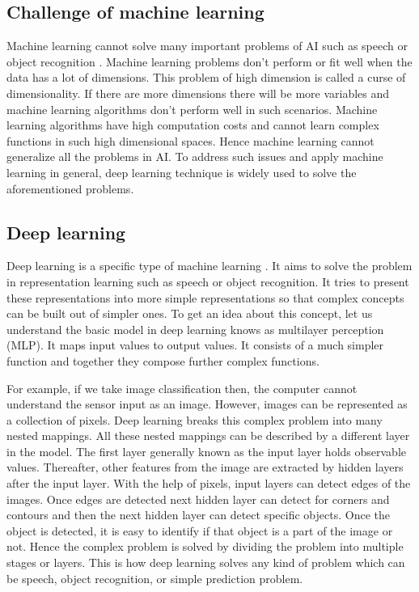 \subsection{Challenge of machine learning}
Machine learning cannot solve many important problems of AI such as speech or object recognition \cite{65}. Machine learning problems don't perform or fit well when the data has a lot of dimensions. This problem of high dimension is called a curse of dimensionality. If there are more dimensions there will be more variables and machine learning algorithms don't perform well in such scenarios. Machine learning algorithms have high computation costs and cannot learn complex functions in such high dimensional spaces. Hence machine learning cannot generalize all the problems in AI. To address such issues and apply machine learning in general, deep learning technique is widely used to solve the aforementioned problems.

\subsection{Deep learning}
Deep learning is a specific type of machine learning \cite{65}. It aims to solve the problem in representation learning such as speech or object recognition. It tries to present these representations into more simple representations so that complex concepts can be built out of simpler ones. To get an idea about this concept, let us understand the basic model in deep learning knows as multilayer perception (MLP). It maps input values to output values. It consists of a much simpler function and together they compose further complex functions. 

For example, if we take image classification then, the computer cannot understand the sensor input as an image. However, images can be represented as a collection of pixels. Deep learning breaks this complex problem into many nested mappings. All these nested mappings can be described by a different layer in the model. The first layer generally known as the input layer holds observable values. Thereafter, other features from the image are extracted by hidden layers after the input layer. With the help of pixels, input layers can detect edges of the images. Once edges are detected next hidden layer can detect for corners and contours and then the next hidden layer can detect specific objects. Once the object is detected, it is easy to identify if that object is a part of the image or not. Hence the complex problem is solved by dividing the problem into multiple stages or layers. This is how deep learning solves any kind of problem which can be speech, object recognition, or simple prediction problem.

